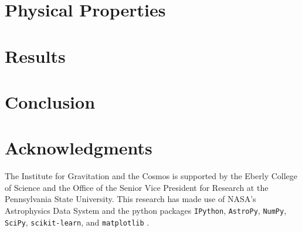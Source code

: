 \documentclass[preprint,natbib209]{aastex}
\begin{document}
\section{Physical Properties}
\label{sec:analysis}



\section{Results}
\label{sec:discussion}



\section{Conclusion}
\label{sec:conclusion}



\acknowledgments
\section*{Acknowledgments}
The Institute for Gravitation and the Cosmos is 
supported by the Eberly College of Science and the Office of the Senior Vice
President for Research at the Pennsylvania 
State University. This research has made use of NASA's Astrophysics Data System 
and the python packages \texttt{IPython}, \texttt{AstroPy}, 
\texttt{NumPy}, \texttt{SciPy}, \texttt{scikit-learn}, and \texttt{matplotlib}
 \citep{ipython, astropy, numpy, scipy, scikit-learn, matplotlib}.



\end{document}
